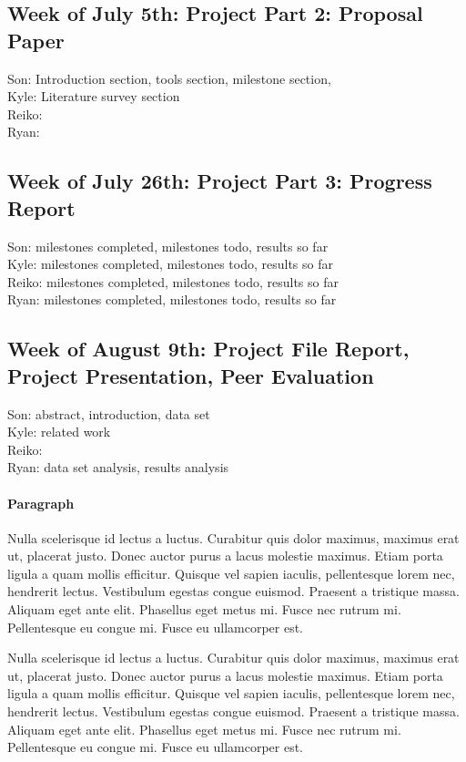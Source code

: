 \documentclass[11pt,sigconf]{acmart}
\begin{document}
\subsection{Week of July 5th: Project Part 2: Proposal Paper}

Son:  Introduction section, tools section, milestone section,  \\
Kyle: Literature survey section \\
Reiko: \\
Ryan: \\

\subsection{Week of July 26th: Project Part 3: Progress Report}

Son: milestones completed, milestones todo, results so far \\
Kyle: milestones completed, milestones todo, results so far \\
Reiko: milestones completed, milestones todo, results so far \\
Ryan: milestones completed, milestones todo, results so far \\

\subsection{Week of August 9th: Project File Report, Project Presentation, Peer Evaluation}

Son: abstract, introduction, data set\\
Kyle: related work\\
Reiko: \\
Ryan: data set analysis, results analysis\\


\paragraph{Paragraph}

Nulla scelerisque id lectus a luctus.
Curabitur quis dolor maximus, maximus erat ut, placerat justo.
Donec auctor purus a lacus molestie maximus.
Etiam porta ligula a quam mollis efficitur.
Quisque vel sapien iaculis, pellentesque lorem nec, hendrerit lectus.
Vestibulum egestas congue euismod.
Praesent a tristique massa.
Aliquam eget ante elit.
Phasellus eget metus mi.
Fusce nec rutrum mi.
Pellentesque eu congue mi.
Fusce eu ullamcorper est.

Nulla scelerisque id lectus a luctus.
Curabitur quis dolor maximus, maximus erat ut, placerat justo.
Donec auctor purus a lacus molestie maximus.
Etiam porta ligula a quam mollis efficitur.
Quisque vel sapien iaculis, pellentesque lorem nec, hendrerit lectus.
Vestibulum egestas congue euismod.
Praesent a tristique massa.
Aliquam eget ante elit.
Phasellus eget metus mi.
Fusce nec rutrum mi.
Pellentesque eu congue mi.
Fusce eu ullamcorper est. \cite{veytsmanlatex}



 
\end{document}
